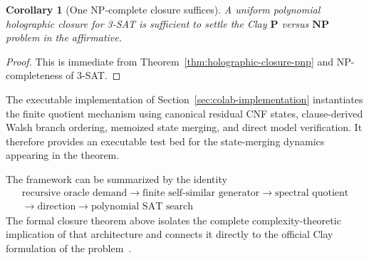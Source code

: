 \documentclass[11pt]{article}
\theoremstyle{plain}
\newtheorem{corollary}[theorem]{Corollary}
\theoremstyle{definition}
\begin{document}
\begin{corollary}[One NP-complete closure suffices]
\label{cor:one-closure-suffices}
A uniform polynomial holographic closure for 3-SAT is sufficient to settle the Clay $\mathbf{P}$ versus $\mathbf{NP}$ problem in the affirmative.
\end{corollary}

\begin{proof}
This is immediate from Theorem~\ref{thm:holographic-closure-pnp} and NP-completeness of 3-SAT.
\end{proof}

The executable implementation of Section~\ref{sec:colab-implementation} instantiates the finite quotient mechanism using canonical residual CNF states, clause-derived Walsh branch ordering, memoized state merging, and direct model verification.  It therefore provides an executable test bed for the state-merging dynamics appearing in the theorem.

The framework can be summarized by the identity
\[
\boxed{
\begin{array}{c}
\text{recursive oracle demand}
\longrightarrow
\text{finite self-similar generator}
\longrightarrow
\text{spectral quotient}
\\[3pt]
\longrightarrow
\text{direction}
\longrightarrow
\text{polynomial SAT search}
\end{array}
}
\]
The formal closure theorem above isolates the complete complexity-theoretic implication of that architecture and connects it directly to the official Clay formulation of the problem~\cite{CookClayPvsNP,ClayPvsNP}.
\end{document}
